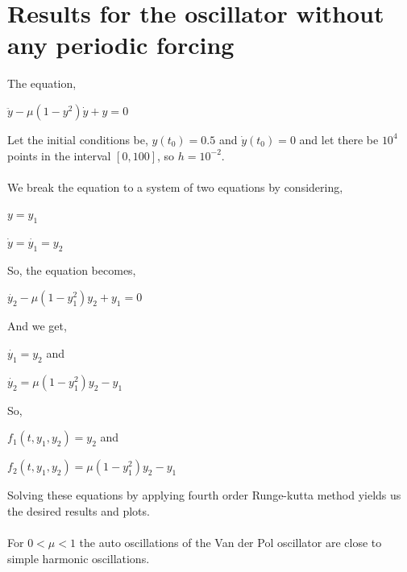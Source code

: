 \documentclass{article}
\begin{document}
\section{Results for the oscillator without any periodic forcing}
The equation,
\begin{center}
$\ddot{y}-\mu(1-y^2)\dot{y}+y=0$
\end{center}
Let the initial conditions be, $y(t_0)=0.5$ and $\dot{y}(t_0)=0$ and let there be $10^4$ points in the interval $[0, 100]$, so $h=10^{-2}$.\\
\\
We break the equation to a system of two equations by considering,
\begin{center}
$y=y_1$\\ \par
$\dot{y}=\dot{y_1}=y_2$
\end{center}
So, the equation becomes,
\begin{center}
$\dot{y_2}-\mu(1-y_1^2)y_2+y_1=0$
\end{center}
And we get,
\begin{center}
$\dot{y_1}=y_2$ and \\ \par
$\dot{y_2}=\mu(1-y_1^2)y_2-y_1$
\end{center}
So,
\begin{center}
$f_1(t, y_1, y_2)=y_2$ and \\ \par
$f_2(t, y_1, y_2)=\mu(1-y_1^2)y_2-y_1$
\end{center}
Solving these equations by applying fourth order Runge-kutta method yields us the desired results and plots. \\ 
\\
For $0<\mu<1$ the auto oscillations of the Van der Pol oscillator are close to simple harmonic oscillations. \\
\\
\end{document}
